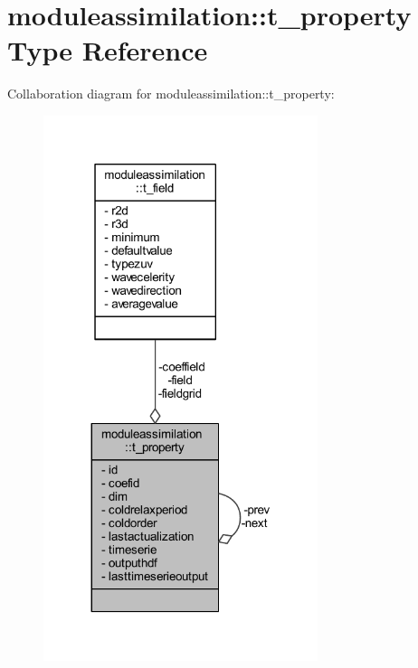 \hypertarget{structmoduleassimilation_1_1t__property}{}\section{moduleassimilation\+:\+:t\+\_\+property Type Reference}
\label{structmoduleassimilation_1_1t__property}


Collaboration diagram for moduleassimilation\+:\+:t\+\_\+property\+:\nopagebreak
\begin{figure}[H]
\begin{center}
\leavevmode
\includegraphics[width=227pt]{structmoduleassimilation_1_1t__property__coll__graph}
\end{center}
\end{figure}
